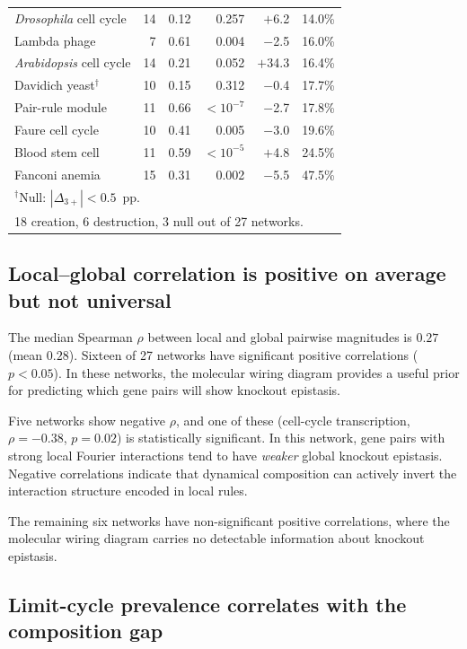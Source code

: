 \documentclass[11pt]{article}
\begin{document}
\begin{longtable}{lrrrrl}
\emph{Drosophila} cell cycle & 14 & 0.12 & 0.257 & $+$6.2 & 14.0\% \\
Lambda phage & 7 & 0.61 & 0.004 & $-$2.5 & 16.0\% \\
\emph{Arabidopsis} cell cycle & 14 & 0.21 & 0.052 & $+$34.3 & 16.4\% \\
Davidich yeast$^\dagger$ & 10 & 0.15 & 0.312 & $-$0.4 & 17.7\% \\
Pair-rule module & 11 & 0.66 & $< 10^{-7}$ & $-$2.7 & 17.8\% \\
Faure cell cycle & 10 & 0.41 & 0.005 & $-$3.0 & 19.6\% \\
Blood stem cell & 11 & 0.59 & $< 10^{-5}$ & $+$4.8 & 24.5\% \\
Fanconi anemia & 15 & 0.31 & 0.002 & $-$5.5 & 47.5\% \\
\midrule
\multicolumn{6}{l}{\footnotesize $^\dagger$Null: $|\Delta_{3+}| < 0.5$~pp.} \\
\multicolumn{6}{l}{\footnotesize 18 creation, 6 destruction, 3 null out of 27 networks.} \\
\end{longtable}


\subsection{Local--global correlation is positive on average but not universal}
\label{sec:rho}

The median Spearman $\rho$ between local and global pairwise
magnitudes is $0.27$ (mean $0.28$). Sixteen of 27 networks have
significant positive correlations ($p < 0.05$). In these networks,
the molecular wiring diagram provides a useful prior for predicting
which gene pairs will show knockout epistasis.

Five networks show negative $\rho$, and one of these
(cell-cycle transcription, $\rho = -0.38$, $p = 0.02$) is
statistically significant. In this network, gene pairs with strong
local Fourier interactions tend to have \emph{weaker} global knockout
epistasis. Negative correlations indicate that dynamical composition
can actively invert the interaction structure encoded in local rules.

The remaining six networks have non-significant positive
correlations, where the molecular wiring diagram carries no detectable
information about knockout epistasis.


\subsection{Limit-cycle prevalence correlates with the composition gap}
\label{sec:cycling}
\end{document}
